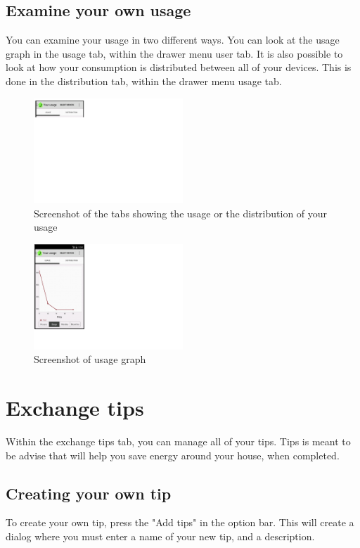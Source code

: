\subsection{Examine your own usage}
You can examine your usage in two different ways. You can look at the usage graph in the usage tab, within the drawer menu user tab. It is also possible to look at how your consumption is distributed between all of your devices. This is done in the distribution tab, within the drawer menu usage tab. 
\begin{figure}[H]
\centering
\includegraphics[width=0.5\textwidth, clip, trim=0cm 17.5cm 20cm 0cm]{appendix/usermanual/fig/TabsWithinUsage.png}
\caption{Screenshot of the tabs showing the usage or the distribution of your usage}
\end{figure}

\begin{figure}[H]
\centering
\includegraphics[width=0.5\textwidth, clip, trim=0cm 4cm 19.5cm 0cm]{appendix/usermanual/fig/UsageGraph.png}
\caption{Screenshot of usage graph}
\end{figure}


\section{Exchange tips}
Within the exchange tips tab, you can manage all of your tips. Tips is meant to be advise that will help you save energy around your house, when completed.

\subsection{Creating your own tip}
To create your own tip, press the "Add tips" in the option bar. This will create a dialog where you must enter a name of your new tip, and a description.
